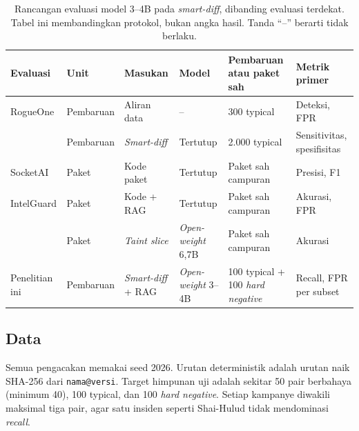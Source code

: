 \documentclass[a4paper,fleqn]{cas-dc}
\begin{document}
\begin{table}[t]
\caption{Rancangan evaluasi model 3--4B pada \emph{smart-diff}, dibanding
evaluasi terdekat. Tabel ini membandingkan protokol, bukan angka hasil.
Tanda ``--'' berarti tidak berlaku.}
\label{tab:eval-protocol}
\small
\begin{tabular}{p{2.6cm} p{1.7cm} p{2.4cm} p{2.8cm} p{3.4cm} p{2.8cm}}
\hline
Evaluasi & Unit & Masukan & Model & Pembaruan atau paket sah & Metrik primer \\
\hline
RogueOne \citep{sofaer2024rogueone}
  & Pembaruan
  & Aliran data
  & --
  & 300 typical
  & Deteksi, FPR \\
\citet{wyss2025evaluating}
  & Pembaruan
  & \emph{Smart-diff}
  & Tertutup
  & 2.000 typical
  & Sensitivitas, spesifisitas \\
SocketAI \citep{zahan2025leveraging}
  & Paket
  & Kode paket
  & Tertutup
  & Paket sah campuran
  & Presisi, F1 \\
IntelGuard \citep{guo2026bridging}
  & Paket
  & Kode + RAG
  & Tertutup
  & Paket sah campuran
  & Akurasi, FPR \\
\citet{nguyen2025taint}
  & Paket
  & \emph{Taint slice}
  & \emph{Open-weight} 6,7B
  & Paket sah campuran
  & Akurasi \\
Penelitian ini
  & Pembaruan
  & \emph{Smart-diff} + RAG
  & \emph{Open-weight} 3--4B
  & 100 typical + 100 \emph{hard negative}
  & Recall, FPR per subset \\
\hline
\end{tabular}
\end{table}

\subsection{Data}\label{sec:data}

Semua pengacakan memakai seed 2026. Urutan deterministik adalah urutan naik
SHA-256 dari \texttt{nama@versi}. Target himpunan uji adalah sekitar 50 pair
berbahaya (minimum 40), 100 typical, dan 100 \emph{hard negative}. Setiap
kampanye diwakili maksimal tiga pair, agar satu insiden seperti Shai-Hulud
tidak mendominasi \emph{recall}.
\end{document}
